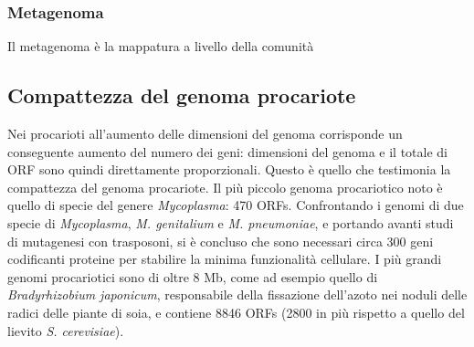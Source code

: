 		\subsubsection{Metagenoma}
		Il metagenoma \`e la mappatura a livello della comunit\`a

	\subsection{Compattezza del genoma procariote}
	Nei procarioti all'aumento delle dimensioni del genoma corrisponde un conseguente aumento del numero dei geni: dimensioni del genoma e il totale di ORF sono quindi direttamente proporzionali. 
	Questo \`e quello che testimonia la compattezza del genoma procariote.
	Il pi\`u piccolo genoma procariotico noto \`e quello di specie del genere \textit{Mycoplasma}: 470 ORFs.
	Confrontando i genomi di due specie di \textit{Mycoplasma}, \textit{M. genitalium} e \textit{M. pneumoniae}, e portando avanti studi di mutagenesi con trasposoni, si \`e concluso che sono necessari circa 300 geni codificanti proteine per stabilire la minima funzionalit\`a cellulare. 
	I pi\`u grandi genomi procariotici sono di oltre 8 Mb, come ad esempio quello di \textit{Bradyrhizobium japonicum}, responsabile della fissazione dell'azoto nei noduli delle radici delle piante di soia, e contiene 8846 ORFs (2800 in pi\`u rispetto a quello del lievito \textit{S. cerevisiae}).

